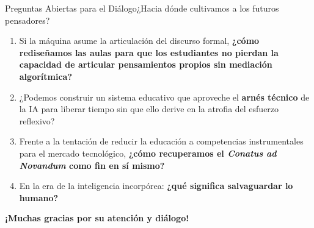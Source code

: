 \documentclass[aspectratio=169,11pt]{beamer}
\begin{document}
\begin{frame}{Preguntas Abiertas para el Diálogo}{¿Hacia dónde
  cultivamos a los futuros pensadores?}
\begin{enumerate}\setlength{\itemsep}{0.8em}
    \item Si la máquina asume la articulación del discurso formal,
      \textbf{¿cómo rediseñamos las aulas para que los estudiantes
        no pierdan la capacidad de articular pensamientos propios sin
      mediación algorítmica?}
    \item ¿Podemos construir un sistema educativo que aproveche el
      \textbf{arnés técnico} de la IA para liberar tiempo sin que
      ello derive en la atrofia del esfuerzo reflexivo?
    \item Frente a la tentación de reducir la educación a
      competencias instrumentales para el mercado tecnológico,
      \textbf{¿cómo recuperamos el \textit{Conatus ad Novandum} como
      fin en sí mismo?}
    \item En la era de la inteligencia incorpórea: \textbf{¿qué
      significa salvaguardar lo humano?}
  \end{enumerate}

  \vspace{0.4cm}
  \centering
  \small\textbf{\color{primaryDark}¡Muchas gracias por su atención y diálogo!}
\end{frame}
\end{document}
